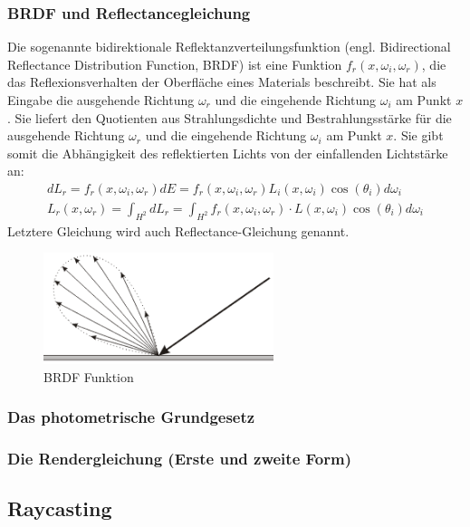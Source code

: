 \subsubsection{BRDF und Reflectancegleichung }
Die sogenannte bidirektionale Reflektanzverteilungsfunktion (engl. Bidirectional Reflectance Distribution Function, BRDF)
ist eine Funktion $f_r (x, \omega_i, \omega_r)$, die das Reflexionsverhalten der Oberfläche eines Materials beschreibt. 
Sie hat als Eingabe die ausgehende Richtung $\omega_r$ und die eingehende Richtung  $\omega_i$ am Punkt $x$. 
Sie  liefert den Quotienten aus Strahlungsdichte und Bestrahlungsstärke für die ausgehende Richtung $\omega_r$ und die eingehende Richtung  $\omega_i$ am Punkt $x$.
Sie gibt somit die Abhängigkeit des reflektierten Lichts von der einfallenden Lichtstärke an: 
\begin{align}
dL_r = f_r(x, \omega_i, \omega_r) dE =   f_r(x, \omega_i, \omega_r) L_i(x,\omega_i) \cos(\theta_i) d \omega_i\\
L_r(x, \omega_r) = \int_{H^2} dL_r =    \int_{H^2}f_r (x, \omega_i, \omega_r) \cdot L(x, \omega_i) \cos(\theta_i) d\omega_i
\end{align}
Letztere Gleichung wird auch Reflectance-Gleichung genannt.
 \begin{figure}[H]
    \centering
    \includegraphics[width=0.6\textwidth]{images/brdf2.png}
    \caption{BRDF Funktion}
    \label{fig:raytracin_brdf}
\end{figure}

\subsubsection{Das photometrische Grundgesetz}
 
\subsubsection{Die Rendergleichung (Erste und zweite Form)}

\subsection{Raycasting}

